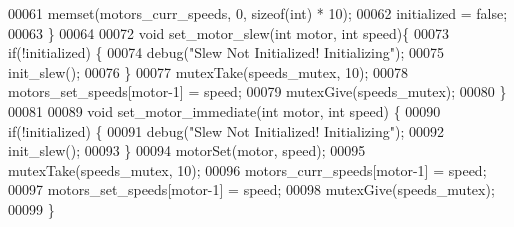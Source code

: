 \begin{DoxyCode}
00061   memset(motors_curr_speeds, 0, \textcolor{keyword}{sizeof}(\textcolor{keywordtype}{int}) * 10);
00062   initialized = \textcolor{keyword}{false};
00063 \}
00064 
00072 \textcolor{keywordtype}{void} set_motor_slew(\textcolor{keywordtype}{int} motor, \textcolor{keywordtype}{int} speed)\{
00073   \textcolor{keywordflow}{if}(!initialized) \{
00074     debug(\textcolor{stringliteral}{"Slew Not Initialized! Initializing"});
00075     init_slew();
00076   \}
00077   mutexTake(speeds_mutex, 10);
00078   motors_set_speeds[motor-1] = speed;
00079   mutexGive(speeds_mutex);
00080 \}
00081 
00089 \textcolor{keywordtype}{void} set_motor_immediate(\textcolor{keywordtype}{int} motor, \textcolor{keywordtype}{int} speed) \{
00090   \textcolor{keywordflow}{if}(!initialized) \{
00091     debug(\textcolor{stringliteral}{"Slew Not Initialized! Initializing"});
00092     init_slew();
00093   \}
00094   motorSet(motor, speed);
00095   mutexTake(speeds_mutex, 10);
00096   motors_curr_speeds[motor-1] = speed;
00097   motors_set_speeds[motor-1] = speed;
00098   mutexGive(speeds_mutex);
00099 \}
\end{DoxyCode}
